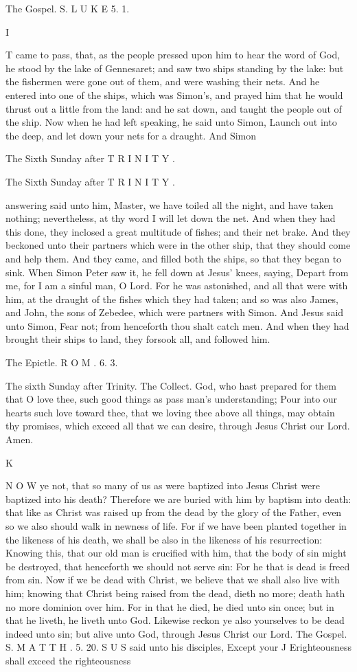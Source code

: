 The Gospel. S. L U K E 5. 1.

I

T came to pass, that, as the people pressed upon him to hear the word of God, he stood by the lake of Gennesaret; and saw two ships standing by the lake: but the fishermen were gone out of them, and were washing their nets. And he entered into one of the ships, which was Simon’s, and prayed him that he would thrust out a little from the land: and he sat down, and taught the people out of the ship. Now when he had left speaking, he said unto Simon, Launch out into the deep, and let down your nets for a draught. And Simon

The Sixth Sunday after T R I N I T Y .

The Sixth Sunday after T R I N I T Y .

answering said unto him, Master, we have toiled all the night, and have taken nothing; nevertheless, at thy word I will let down the net. And when they had this done, they inclosed a great multitude of fishes; and their net brake. And they beckoned unto their partners which were in the other ship, that they should come and help them. And they came, and filled both the ships, so that they began to sink. When Simon Peter saw it, he fell down at Jesus’ knees, saying, Depart from me, for I am a sinful man, O Lord. For he was astonished, and all that were with him, at the draught of the fishes which they had taken; and so was also James, and John, the sons of Zebedee, which were partners with Simon. And Jesus said unto Simon, Fear not; from henceforth thou shalt catch men. And when they had brought their ships to land, they forsook all, and followed him.

The Epictle. R O M . 6. 3.

The sixth Sunday after Trinity. The Collect. God, who hast prepared for them that O love thee, such good things as pass man’s understanding; Pour into our hearts such love toward thee, that we loving thee above all things, may obtain thy promises, which exceed all that we can desire, through Jesus Christ our Lord. Amen.

K

N O W ye not, that so many of us as were baptized into Jesus Christ were baptized into his death? Therefore we are buried with him by baptism into death: that like as Christ was raised up from the dead by the glory of the Father, even so we also should walk in newness of life. For if we have been planted together in the likeness of his death, we shall be also in the likeness of his resurrection: Knowing this, that our old man is crucified with him, that the body of sin might be destroyed, that henceforth we should not serve sin: For he that is dead is freed from sin. Now if we be dead with Christ, we believe that we shall also live with him; knowing that Christ being raised from the dead, dieth no more; death hath no more dominion over him. For in that he died, he died unto sin once; but in that he liveth, he liveth unto God. Likewise reckon ye also yourselves to be dead indeed unto sin; but alive unto God, through Jesus Christ our Lord. The Gospel. S. M A T T H . 5. 20. S U S said unto his disciples, Except your J Erighteousness shall exceed the righteousness

